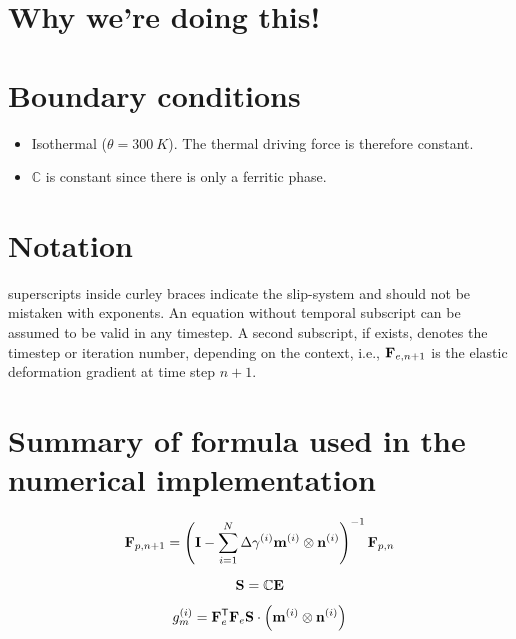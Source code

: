\documentclass{article}
\begin{document}

\section{Why we're doing this!}

\section{Boundary conditions}

\begin{itemize}
    \item Isothermal ($\theta = 300 \ K$). The thermal driving force is therefore constant.
    \item $\mathbb C$ is constant since there is only a ferritic phase.
\end{itemize}

\section{Notation}
superscripts inside curley braces indicate the slip-system and should not be mistaken with exponents.
An equation without temporal subscript can be assumed to be valid in any timestep.
A second subscript, if exists, denotes the timestep or iteration number, depending on the context, i.e., ${\bf F}_{e, n+1}$ is the elastic deformation gradient at time step $n+1$.

\section[]{Summary of formula used in the numerical implementation}

\begin{equation}
    {\bf F}_{p, n+1} = \left({\bf I} - \sum_{i=1}^N \Delta \gamma^{(i)} {\bf m}^{(i)} \otimes {\bf n}^{(i)}\right)^{-1} {\bf F}_{p, n}
\end{equation}

\begin{equation}
    \bf S = \mathbb C \bf E
\end{equation}

\begin{equation}
    g_m^{(i)} = {\bf F}_e^{\sf T} {\bf F}_e {\bf S} \cdot \left( {\bf m}^{(i)} \otimes {\bf n}^{(i)} \right)
\end{equation}
\end{document}
